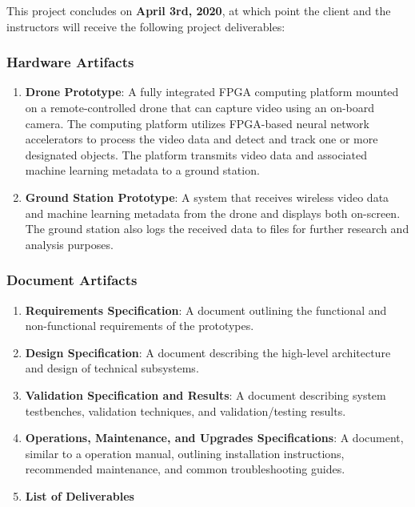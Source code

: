 This project concludes on \textbf{April 3rd, 2020}, at which point the client
and the instructors will receive the following project deliverables:

\subsubsection{Hardware Artifacts}

\begin{enumerate}

\item \textbf{Drone Prototype}:
A fully integrated FPGA computing platform mounted on a remote-controlled
drone that can capture video using an on-board camera.
The computing platform utilizes FPGA-based neural network accelerators to 
process the video data and detect and track one or more designated objects.
The platform transmits video data and associated machine learning metadata
to a ground station.

\item \textbf{Ground Station Prototype}:
A system that receives wireless video data and machine learning metadata from
the drone and displays both on-screen. The ground station also logs the received data 
to files for further research and analysis purposes.

\end{enumerate}

\subsubsection{Document Artifacts}\label{document-artifacts}

\begin{enumerate}

\item\textbf{Requirements Specification}:
A document outlining the functional and non-functional requirements
of the prototypes.

\item \textbf{Design Specification}:
A document describing the high-level architecture and design of technical subsystems.

\item \textbf{Validation Specification and Results}:
A document describing system testbenches, validation techniques, and validation/testing results.

\item \textbf{Operations, Maintenance, and Upgrades Specifications}:
A document, similar to a operation manual, outlining installation instructions,
recommended maintenance, and common troubleshooting guides.

\item \textbf{List of Deliverables}

\end{enumerate}

